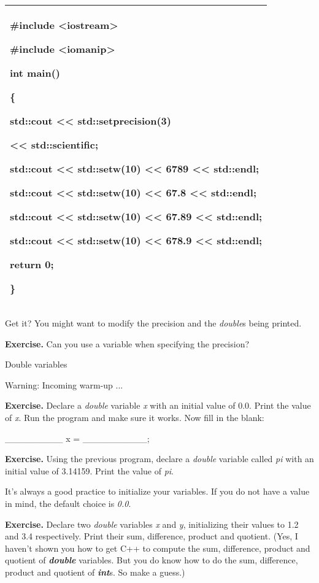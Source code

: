 \documentclass[
]{article}
\begin{document}
\begin{longtable}[]{@{}l@{}}
\toprule
\endhead
\begin{minipage}[t]{0.97\columnwidth}\raggedright
\#include \textless iostream\textgreater{}

\#include \textless iomanip\textgreater{}

int main()

\{

std::cout \textless\textless{} std::setprecision(3)

\textless\textless{} std::scientific;

std::cout \textless\textless{} std::setw(10) \textless\textless{} 6789
\textless\textless{} std::endl;

std::cout \textless\textless{} std::setw(10) \textless\textless{} 67.8
\textless\textless{} std::endl;

std::cout \textless\textless{} std::setw(10) \textless\textless{} 67.89
\textless\textless{} std::endl;

std::cout \textless\textless{} std::setw(10) \textless\textless{} 678.9
\textless\textless{} std::endl;

return 0;

\}\strut
\end{minipage}\tabularnewline
\bottomrule
\end{longtable}

Get it? You might want to modify the precision and the \emph{double}s
being printed.

\textbf{Exercise.} Can you use a variable when specifying the precision?

Double variables

Warning: Incoming warm-up ...

\textbf{Exercise.} Declare a \emph{double} variable \emph{x} with an
initial value of 0.0. Print the value of \emph{x}. Run the program and
make sure it works. Now fill in the blank:

\_\_\_\_\_\_\_\_\_ x = \_\_\_\_\_\_\_\_\_\_;

\textbf{Exercise.} Using the previous program, declare a \emph{double}
variable called \emph{pi} with an initial value of 3.14159. Print the
value of \emph{pi}.

It's always a good practice to initialize your variables. If you do not
have a value in mind, the default choice is \emph{0.0}.

\textbf{Exercise.} Declare two \emph{double} variables \emph{x} and
\emph{y}, initializing their values to 1.2 and 3.4 respectively. Print
their sum, difference, product and quotient. (Yes, I haven't shown you
how to get C++ to compute the sum, difference, product and quotient of
\emph{\textbf{double}} variables. But you do know how to do the sum,
difference, product and quotient of \emph{\textbf{int}}s. So make a
guess.)
\end{document}
